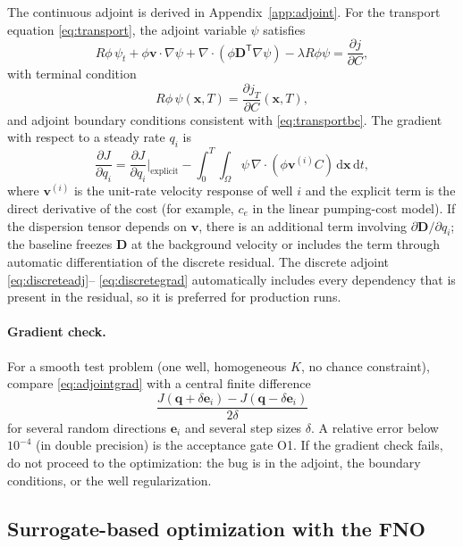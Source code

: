 \documentclass[11pt]{article}
\numberwithin{equation}{section}
\newcommand{\dd}{\,\mathrm{d}}
\newcommand{\pdd}[2]{\frac{\partial #1}{\partial #2}}
\newcommand{\xx}{\mathbf{x}}
\newcommand{\vv}{\mathbf{v}}
\newcommand{\DD}{\mathbf{D}}
\newcommand{\T}{\mathsf{T}}
\theoremstyle{plain}
\begin{document}
The continuous adjoint is derived in Appendix~\ref{app:adjoint}.  For the
transport equation \eqref{eq:transport}, the adjoint variable $\psi$ satisfies
\begin{equation}
\label{eq:adjoint}
R\phi\,\psi_t+\phi\vv\cdot\nabla\psi
+\nabla\cdot(\phi\DD^{\T}\nabla\psi)
-\lambda R\phi\psi
=\pdd{j}{C},
\end{equation}
with terminal condition
\begin{equation}
\label{eq:adjointterminal}
R\phi\,\psi(\xx,T)=\pdd{j_T}{C}(\xx,T),
\end{equation}
and adjoint boundary conditions consistent with \eqref{eq:transportbc}.  The
gradient with respect to a steady rate $q_i$ is
\begin{equation}
\label{eq:adjointgrad}
\pdd{J}{q_i}
=\pdd{J}{q_i}\bigg|_{\text{explicit}}
-\int_0^T\int_\Omega
\psi\,\nabla\cdot(\phi\vv^{(i)}C)\dd\xx\dd t,
\end{equation}
where $\vv^{(i)}$ is the unit-rate velocity response of well $i$ and the
explicit term is the direct derivative of the cost (for example, $c_e$ in the
linear pumping-cost model).  If the dispersion tensor depends on $\vv$, there
is an additional term involving
$\partial\DD/\partial q_i$; the baseline freezes $\DD$ at the background
velocity or includes the term through automatic differentiation of the
discrete residual.  The discrete adjoint \eqref{eq:discreteadj}--
\eqref{eq:discretegrad} automatically includes every dependency that is
present in the residual, so it is preferred for production runs.

\paragraph{Gradient check.}
For a smooth test problem (one well, homogeneous $K$, no chance constraint),
compare \eqref{eq:adjointgrad} with a central finite difference
\begin{equation}
\label{eq:fdcheck}
\frac{J(\mathbf{q}+\delta\mathbf{e}_i)-J(\mathbf{q}-\delta\mathbf{e}_i)}
{2\delta}
\end{equation}
for several random directions $\mathbf{e}_i$ and several step sizes
$\delta$.  A relative error below $10^{-4}$ (in double precision) is the
acceptance gate O1.  If the gradient check fails, do not proceed to the
optimization: the bug is in the adjoint, the boundary conditions, or the
well regularization.

\subsection{Surrogate-based optimization with the FNO}
\label{sec:surrogate}
\end{document}
